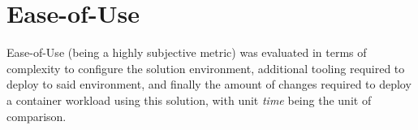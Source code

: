 \section{Ease-of-Use}
Ease-of-Use (being a highly subjective metric) was evaluated in terms of complexity to configure the solution environment, additional tooling required to deploy to said environment,
and finally the amount of changes required to deploy a container workload using this solution, with unit \textit{time} being the unit of comparison.
